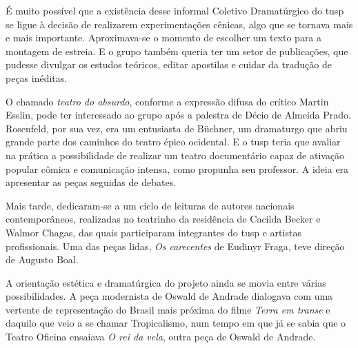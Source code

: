 É muito possível que a existência desse informal Coletivo Dramatúrgico
do {\sc tusp} se ligue à decisão de realizarem experimentações cênicas, algo
que se tornava mais e mais importante. Aproximava-se o momento de
escolher um texto para a montagem de estreia. E o grupo também queria ter
um setor de publicações, que pudesse divulgar os estudos teóricos,
editar apostilas e cuidar da tradução de peças inéditas.


O chamado {\it teatro do absurdo}, conforme a expressão difusa
do crítico Martin Esslin, pode ter interessado ao grupo após a
palestra de Décio de Almeida Prado. Rosenfeld, por sua vez, era um
entusiasta de Büchner, um dramaturgo que abriu grande parte dos caminhos
do teatro épico ocidental. E o {\sc tusp} teria que avaliar na prática a
possibilidade de realizar um teatro documentário capaz de ativação
popular cômica e comunicação intensa, como propunha seu professor. A
ideia era apresentar as peças seguidas de debates.


Mais tarde, dedicaram-se a um ciclo de leituras de autores nacionais
contemporâneos, realizadas no teatrinho da residência de Cacilda Becker
e Walmor Chagas, das quais participaram integrantes do {\sc tusp} e artistas
profissionais. Uma das peças lidas, {\it Os carecentes} de Eudinyr
Fraga, teve direção de Augusto Boal.

A orientação estética e dramatúrgica do projeto ainda se movia entre
várias possibilidades. A peça modernista de Oswald de Andrade dialogava
com uma vertente de representação do Brasil mais próxima do filme
{\it Terra em transe} e daquilo que veio a se chamar Tropicalismo, num
tempo em que já se sabia que o Teatro Oficina ensaiava {\it O rei da
vela}, outra peça de Oswald de Andrade.

